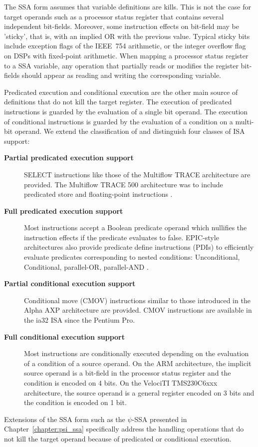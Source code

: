 The SSA form assumes that variable definitions are kills. This is not the case
for target operands such as a processor status register that contains several
independent bit-fields. Moreover, some instruction effects on bit-field may be
'sticky', that is, with an implied OR with the previous value. Typical sticky
bits include exception flags of the IEEE~754 arithmetic, or the integer overflow
flag on DSPs with fixed-point arithmetic. When mapping a processor status
register to a SSA variable, any operation that partially reads or modifies the
register bit-fields should appear as reading and writing the corresponding
variable.

Predicated execution and conditional execution are the other main source of
definitions that do not kill the target register. The execution of predicated
instructions is guarded by the evaluation of a single bit operand. The execution
of conditional instructions is guarded by the evaluation of a condition on a
multi-bit operand. We extend the classification of \cite{Mahlke:1995:ISCA} and
distinguish four classes of ISA support: \begin{description}

\item[\bf Partial predicated execution support] SELECT instructions like those
of the Multiflow TRACE architecture \cite{Colwell:1987:ASPLOS} are provided. The
Multiflow TRACE 500 architecture was to include predicated store and
floating-point instructions \cite{Lowney:1993:JS}.

\item[\bf Full predicated execution support] Most instructions accept a Boolean
predicate operand which nullifies the instruction effects if the predicate
evaluates to false. EPIC-style architectures also provide predicate define
instructions (PDIs) to efficiently evaluate predicates corresponding to nested
conditions: Unconditional, Conditional, parallel-OR, parallel-AND
\cite{Gillies:1996:MICRO}.

\item[\bf Partial conditional execution support] Conditional move (CMOV)
instructions similar to those introduced in the Alpha AXP architecture
\cite{Blickstein:1992:DTJ} are provided. CMOV instructions are available in the
ia32 ISA since the Pentium Pro.

\item[\bf Full conditional execution support] Most instructions are
conditionally executed depending on the evaluation of a condition of a source
operand. On the ARM architecture, the implicit source operand is a bit-field in
the processor status register and the condition is encoded on 4 bits. On the
VelociTI{\texttrademark} TMS230C6xxx architecture, the source operand is a
general register encoded on 3 bits and the condition is encoded on 1 bit.

\end{description}
Extensions of the SSA form such as the $\psi$-SSA \cite{Stoutchinin:2001:MICRO}
presented in Chapter~\ref{chapter:psi_ssa} specifically address the handling
operations that do not kill the target operand because of predicated or
conditional execution.

